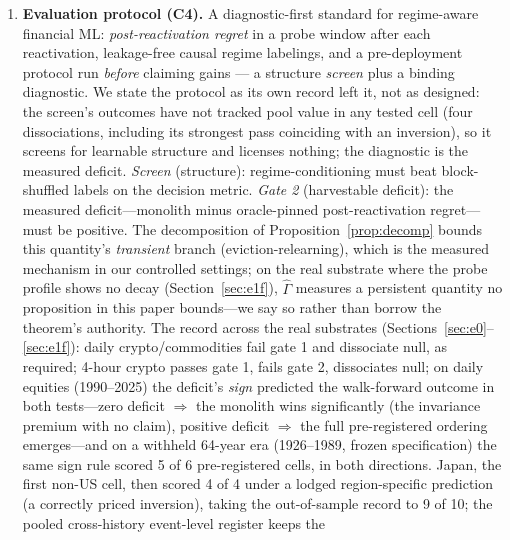 \documentclass{article}
\begin{document}
\begin{enumerate}
    regret metric (Lemma~\ref{lem:bridge})---closing the technical gap
    between Inv-PnCO-style guarantees \citep{yan2026invpnco} and decision
    regret. A break-even analysis (Proposition~\ref{prop:breakeven}) gives
    the dormancy window in which retention pays once idle-specialist carrying
    costs are charged.
    \item \textbf{Evaluation protocol (C4).} A diagnostic-first
    standard for regime-aware financial ML:
    \emph{post-reactivation regret} in a probe window after each
    reactivation, leakage-free causal regime labelings, and a
    pre-deployment protocol run \emph{before} claiming gains --- a
    structure \emph{screen} plus a binding diagnostic. We state the
    protocol as its own record left it, not as designed: the screen's
    outcomes have not tracked pool value in any tested cell (four
    dissociations, including its strongest pass coinciding with an
    inversion), so it screens for learnable structure and licenses
    nothing; the diagnostic is the measured deficit. \emph{Screen}
    (structure): regime-conditioning must beat block-shuffled labels on
    the decision metric. \emph{Gate 2} (harvestable deficit): the
    measured deficit---monolith minus oracle-pinned post-reactivation
    regret---must be positive. The decomposition of
    Proposition~\ref{prop:decomp} bounds this quantity's
    \emph{transient} branch (eviction-relearning), which is the
    measured mechanism in our controlled settings; on the real
    substrate where the probe profile shows no decay
    (Section~\ref{sec:e1f}), $\hat\Gamma$ measures a persistent
    quantity no proposition in this paper bounds---we say so rather
    than borrow the theorem's authority. The record across
    the real substrates (Sections~\ref{sec:e0}--\ref{sec:e1f}): daily
    crypto/commodities fail gate 1 and dissociate null, as required;
    4-hour crypto passes gate 1, fails gate 2, dissociates null; on
    daily equities (1990--2025) the deficit's \emph{sign} predicted the
    walk-forward outcome in both tests---zero deficit $\Rightarrow$ the
    monolith wins significantly (the invariance premium with no claim),
    positive deficit $\Rightarrow$ the full pre-registered ordering
    emerges---and on a withheld 64-year era (1926--1989, frozen
    specification) the same sign rule scored 5 of 6 pre-registered
    cells, in both directions. Japan, the first non-US cell, then
    scored 4 of 4 under a lodged region-specific prediction (a
    correctly priced inversion), taking the out-of-sample record to
    9 of 10; the pooled cross-history event-level register keeps the

\end{enumerate}
\end{document}
